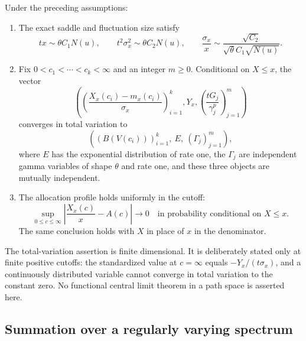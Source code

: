 \begin{theorem}\label{mc:thm:joint}
Under the preceding assumptions:
\begin{enumerate}
\item The exact saddle and fluctuation size satisfy
\begin{equation}\label{mc:eq:scales}
 tx\sim\theta C_1N(u),\qquad
 t^2\sigma_x^2\sim\theta C_2N(u),\qquad
 \frac{\sigma_x}{x}\sim
 \frac{\sqrt{C_2}}{\sqrt\theta C_1\sqrt{N(u)}}.
\end{equation}

\item Fix $0<c_1<\cdots<c_k<\infty$ and an integer $m\geq0$.
Conditional on $X\leq x$, the vector
\begin{equation}\label{mc:eq:jointvector}
 \left(
 \left(\frac{X_x(c_i)-m_x(c_i)}{\sigma_x}\right)_{i=1}^k,
 Y_x,
 \left(\frac{tG_j}{\gamma_j^p}\right)_{j=1}^m
 \right)
\end{equation}
converges in total variation to
\begin{equation}\label{mc:eq:jointlimit}
 \left((B(V(c_i)))_{i=1}^k,\ E,\ (\Gamma_j)_{j=1}^m\right),
\end{equation}
where $E$ has the exponential distribution of rate one, the $\Gamma_j$
are independent gamma variables of shape $\theta$ and rate one, and these
three objects are mutually independent.

\item The allocation profile holds uniformly in the cutoff:
\begin{equation}\label{mc:eq:uniformLLN}
 \sup_{0\leq c\leq\infty}
 \left|\frac{X_x(c)}{x}-A(c)\right|
 \longrightarrow0
 \quad\text{in probability conditional on }X\leq x.
\end{equation}
The same conclusion holds with $X$ in place of $x$ in the denominator.
\end{enumerate}
\end{theorem}

The total-variation assertion is finite dimensional.  It is deliberately
stated only at finite positive cutoffs: the standardized value at
$c=\infty$ equals $-Y_x/(t\sigma_x)$, and a continuously distributed
variable cannot converge in total variation to the constant zero.  No
functional central limit theorem in a path space is asserted here.

\subsection{Summation over a regularly varying spectrum}

